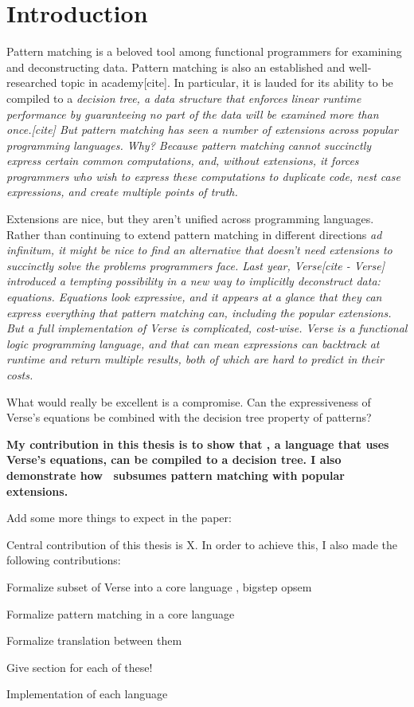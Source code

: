 \documentclass[manuscript,screen,review, 12pt, nonacm]{acmart}
\begin{document}
\section{Introduction}

Pattern matching is a beloved tool among functional programmers for examining
and deconstructing data. 
Pattern matching is also an established and well-researched topic in
academy[cite]. In particular, it is lauded for its ability to be compiled to a
\it{decision tree}, a data structure that enforces linear runtime performance by
guaranteeing no part of the data will be examined more than once.[cite]
But pattern matching has seen a number of extensions across popular programming
languages. Why? 
Because pattern matching cannot succinctly express certain
common computations, and, without extensions, it forces programmers who wish to
express these computations to duplicate code, nest case expressions, and create
multiple points of truth. 

Extensions are nice, but they aren't unified across programming languages.
Rather than continuing to extend pattern matching in different directions \it{ad
infinitum}, it might be nice to find an alternative that doesn't need extensions
to succinctly solve the problems programmers face. Last year, Verse[cite -
Verse] introduced a tempting possibility in a new way to implicitly deconstruct
data: equations. Equations look expressive, and it appears at a glance that they
can express everything that pattern matching can, including the popular
extensions. 
But a full implementation of Verse is complicated, cost-wise. Verse is a
functional logic programming language, and that can mean expressions can
backtrack at runtime and return multiple results, both of which are
hard to predict in their costs. 

What would really be excellent is a compromise.
Can the expressiveness of Verse's equations be combined with the decision tree
property of patterns? 


\bf{My contribution in this thesis} is to show that \VMinus, a language that
uses Verse's equations, can be compiled to a decision tree. I also demonstrate
how \VMinus\ subsumes pattern matching with popular extensions. 

Add some more things to expect in the paper: 

Central contribution of this thesis is X. In order to achieve this, 
I also made the following contributions: 

Formalize subset of Verse into a core language \VMinus, bigstep opsem 

Formalize pattern matching in a core language \PPlus 

Formalize translation between them 

Give section for each of these! 

Implementation of each language 
\end{document}
